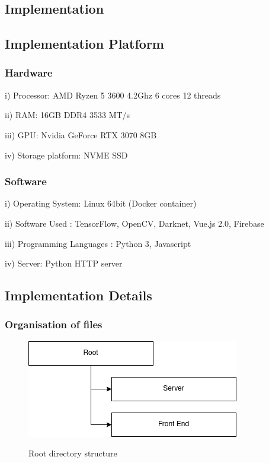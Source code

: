 \documentclass[ 12pt,a4paper,twocolumn,fleqn]{article}
\begin{document}
\begin{adjustwidth}{3.5em}{0pt}
 \section{Implementation}
 
 \subsection{Implementation Platform}
 
 \subsubsection{Hardware}
 
  i) Processor: AMD Ryzen 5 3600 4.2Ghz 6 cores 12 threads
 
 ii) RAM: 16GB DDR4 3533 MT/s
 
 iii) GPU: Nvidia GeForce RTX 3070 8GB
 
 iv) Storage platform: NVME SSD
 
 
 \subsubsection{Software} 
 i) Operating System: Linux 64bit (Docker container)
 
 ii) Software Used : TensorFlow, OpenCV, Darknet, Vue.js 2.0, Firebase
 
 iii) Programming Languages : Python 3, Javascript
 
 iv) Server: Python HTTP server
 
 
 \newpage
  \pagestyle{fancy}
 
\subsection{Implementation Details} 

\subsubsection{Organisation of files}

\begin{figure}[H]
\begin{center}
    \hspace*{0.4in}
    \includegraphics[scale=0.6]{media/root.png}
    \\
  \caption{ Root directory structure  }
\end{center}
\end{figure}


\end{adjustwidth}
\end{document}
